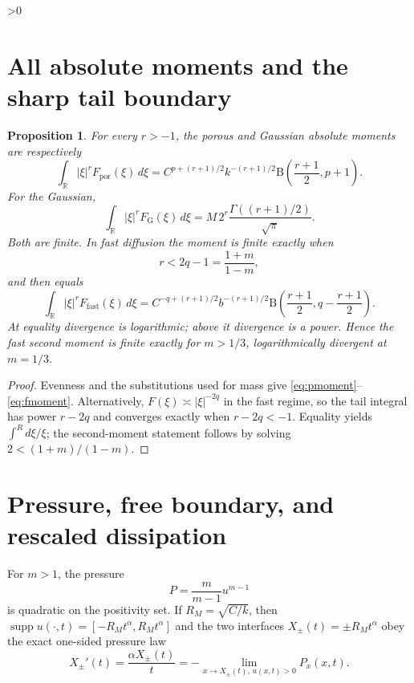 \documentclass[9pt]{extarticle}
\newtheorem{proposition}{Proposition}
\newcommand{\R}{\mathbb R}
\newcommand{\B}{\mathrm B}
\begin{document}
\ifnum\CRevisionRound>0
\section{All absolute moments and the sharp tail boundary}
\begin{proposition}\label{prop:moments}
For every $r>-1$, the porous and Gaussian absolute moments are respectively
\begin{equation}\label{eq:pmoment}
 \int_\R |\xi|^rF_{\mathrm{por}}(\xi)\,d\xi
 =C^{p+(r+1)/2}k^{-(r+1)/2}
 \B\!\left(\frac{r+1}{2},p+1\right).
\end{equation}
For the Gaussian,
\begin{equation}\label{eq:gmoment}
 \int_\R |\xi|^rF_{\mathrm{G}}(\xi)\,d\xi
 =M\,2^r\frac{\Gamma((r+1)/2)}{\sqrt\pi}.
\end{equation}
Both are finite.  In fast diffusion the moment is finite exactly when
\begin{equation}\label{eq:threshold}
 r<2q-1=\frac{1+m}{1-m},
\end{equation}
and then equals
\begin{equation}\label{eq:fmoment}
 \int_\R |\xi|^rF_{\mathrm{fast}}(\xi)\,d\xi
 =C^{-q+(r+1)/2}b^{-(r+1)/2}
 \B\!\left(\frac{r+1}{2},q-\frac{r+1}{2}\right).
\end{equation}
At equality divergence is logarithmic; above it divergence is a power.
Hence the fast second moment is finite exactly for $m>1/3$, logarithmically
divergent at $m=1/3$.
\end{proposition}
\begin{proof}
Evenness and the substitutions used for mass give
\eqref{eq:pmoment}--\eqref{eq:fmoment}.  Alternatively,
$F(\xi)\asymp |\xi|^{-2q}$ in the fast regime, so the tail integral has
power $r-2q$ and converges exactly when $r-2q<-1$.  Equality yields
$\int^R d\xi/\xi$; the second-moment statement follows by solving
$2<(1+m)/(1-m)$.
\end{proof}

\section{Pressure, free boundary, and rescaled dissipation}
For $m>1$, the pressure
\[
 P=\frac{m}{m-1}u^{m-1}
\]
is quadratic on the positivity set.  If $R_M=\sqrt{C/k}$, then
$\operatorname{supp}u(\cdot,t)=[-R_Mt^\alpha,R_Mt^\alpha]$ and the two
interfaces $X_\pm(t)=\pm R_Mt^\alpha$ obey the exact one-sided pressure law
\[
 X_\pm'(t)=\frac{\alpha X_\pm(t)}t
 =-\lim_{x\to X_\pm(t),\,u(x,t)>0}P_x(x,t).
\]
\end{document}
